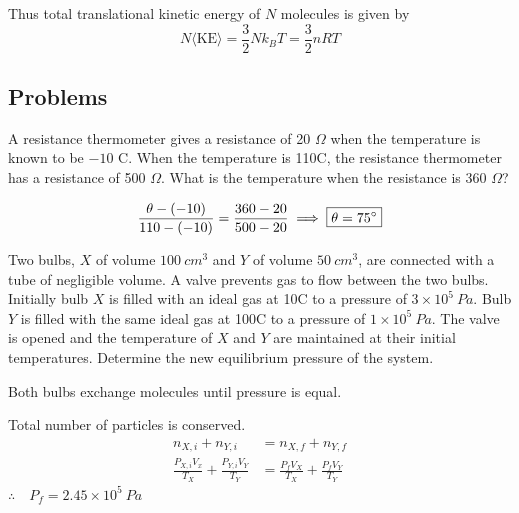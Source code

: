 Thus total translational kinetic energy of $N$ molecules is given by
\begin{equation}
N\langle\text{KE}\rangle=\frac{3}{2}Nk_BT=\frac{3}{2}nRT
\end{equation}
\pagebreak

\subsection*{Problems}
\begin{prbm}
A resistance thermometer gives a resistance of 20 $\Omega$ when the temperature is known to be $-10$ \degree C. When the temperature is 110\degree C, the resistance thermometer has a resistance of 500 $\Omega$. What is the temperature when the resistance is 360 $\Omega$?
\end{prbm}
\begin{solution}
\[ \frac{\theta-(-10)}{110-(-10)}=\frac{360-20}{500-20} \implies \boxed{\theta=75\degree} \]
\end{solution}

\begin{prbm}
Two bulbs, $X$ of volume $100\:\unit{cm^3}$ and $Y$ of volume $50\:\unit{cm^3}$, are connected with a tube of negligible volume. A valve prevents gas to flow between the two bulbs. Initially bulb $X$ is filled with an ideal gas at 10\degree C to a pressure of $3\times10^5\:\unit{Pa}$. Bulb $Y$ is filled with the same ideal gas at 100\degree C to a pressure of $1\times10^5\:\unit{Pa}$. The valve is opened and the temperature of $X$ and $Y$ are maintained at their initial temperatures. Determine the new equilibrium pressure of the system.
\end{prbm}
\begin{solution}
Both bulbs exchange molecules until pressure is equal.

Total number of particles is conserved.
\begin{align*}
n_{X,i}+n_{Y,i} &= n_{X,f}+n_{Y,f} \\
\frac{P_{X,i}V_x}{T_X}+\frac{P_{Y,i}V_Y}{T_Y} &= \frac{P_fV_X}{T_X}+\frac{P_fV_Y}{T_Y}
\end{align*}
$\therefore\quad \boxed{P_f=2.45 \times 10^5\:\unit{Pa}}$
\end{solution}
\pagebreak
